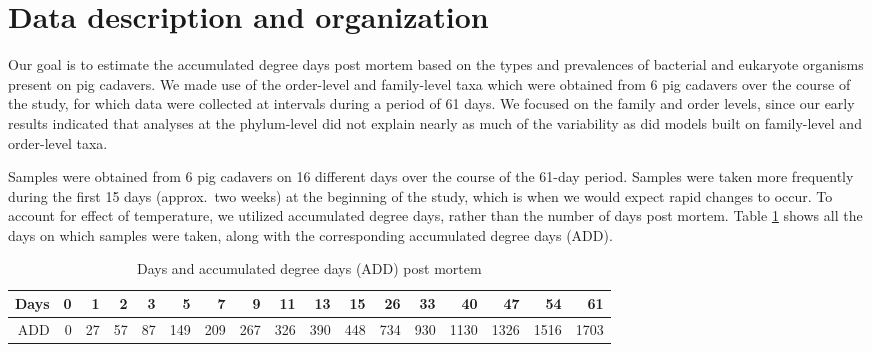\documentclass{article}
\begin{document}
\section{Data description and organization}

Our goal is to estimate the accumulated degree days post mortem based
on the types and prevalences of bacterial and eukaryote organisms
present on pig cadavers.  We made use of the order-level and
family-level taxa which were obtained from 6 pig cadavers over the
course of the study, for which data were collected at intervals during
a period of 61 days.  We focused on the family and order levels, since
our early results indicated that analyses at the phylum-level did not
explain nearly as much of the variability as did models built on
family-level and order-level taxa.

Samples were obtained from 6 pig cadavers on 16 different days over
the course of the 61-day period.  Samples were taken more frequently
during the first 15 days (approx.~two weeks) at the beginning of the
study, which is when we would expect rapid changes to occur.  To
account for effect of temperature, we utilized accumulated degree
days, rather than the number of days post mortem.  Table
\ref{tbl:degdays_vs_days} shows all the days on which samples were
taken, along with the corresponding accumulated degree days (ADD).
\begin{table}[hb]
  \centering
  \caption{\label{tbl:degdays_vs_days}Days and accumulated degree days
    (ADD) post mortem}
  \begin{tabular}{r|rrrrrrrrrrrrrrrr}
  Days & 0 & 1 & 2 & 3 & 5 & 7 & 9 & 11 & 13 & 15 & 26 & 33 & 40 & 47 & 54 & 61\\ \hline
  ADD & 0 & 27 & 57 & 87 & 149 & 209 & 267 & 326 & 390 & 448 & 734 & 930 & 1130 & 1326 & 1516 & 1703
  \end{tabular}
\end{table}
\end{document}
